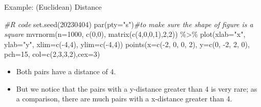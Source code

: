 \documentclass[
  ignorenonframetext,
]{beamer}
\newenvironment{Shaded}{\begin{snugshade}}{\end{snugshade}}
\newcommand{\AttributeTok}[1]{\textcolor[rgb]{0.77,0.63,0.00}{#1}}
\newcommand{\CommentTok}[1]{\textcolor[rgb]{0.56,0.35,0.01}{\textit{#1}}}
\newcommand{\DecValTok}[1]{\textcolor[rgb]{0.00,0.00,0.81}{#1}}
\newcommand{\FunctionTok}[1]{\textcolor[rgb]{0.00,0.00,0.00}{#1}}
\newcommand{\NormalTok}[1]{#1}
\newcommand{\SpecialCharTok}[1]{\textcolor[rgb]{0.00,0.00,0.00}{#1}}
\newcommand{\StringTok}[1]{\textcolor[rgb]{0.31,0.60,0.02}{#1}}
\providecommand{\tightlist}{%
  \setlength{\itemsep}{0pt}\setlength{\parskip}{0pt}}
\begin{document}
\begin{frame}[fragile]{Example: (Euclidean) Distance}
\protect\hypertarget{example-euclidean-distance-2}{}
\begin{Shaded}
\begin{Highlighting}[]
\CommentTok{\#R code}
\FunctionTok{set.seed}\NormalTok{(}\DecValTok{20230404}\NormalTok{)}
\FunctionTok{par}\NormalTok{(}\AttributeTok{pty=}\StringTok{"s"}\NormalTok{)}\CommentTok{\#to make sure the shape of figure is a square}
\FunctionTok{mvrnorm}\NormalTok{(}\AttributeTok{n=}\DecValTok{1000}\NormalTok{, }\FunctionTok{c}\NormalTok{(}\DecValTok{0}\NormalTok{,}\DecValTok{0}\NormalTok{), }\FunctionTok{matrix}\NormalTok{(}\FunctionTok{c}\NormalTok{(}\DecValTok{4}\NormalTok{,}\DecValTok{0}\NormalTok{,}\DecValTok{0}\NormalTok{,}\DecValTok{1}\NormalTok{),}\DecValTok{2}\NormalTok{,}\DecValTok{2}\NormalTok{)) }\SpecialCharTok{\%\textgreater{}\%} 
  \FunctionTok{plot}\NormalTok{(}\AttributeTok{xlab=}\StringTok{"x"}\NormalTok{, }\AttributeTok{ylab=}\StringTok{"y"}\NormalTok{, }\AttributeTok{xlim=}\FunctionTok{c}\NormalTok{(}\SpecialCharTok{{-}}\DecValTok{4}\NormalTok{,}\DecValTok{4}\NormalTok{), }\AttributeTok{ylim=}\FunctionTok{c}\NormalTok{(}\SpecialCharTok{{-}}\DecValTok{4}\NormalTok{,}\DecValTok{4}\NormalTok{))}
\FunctionTok{points}\NormalTok{(}\AttributeTok{x=}\FunctionTok{c}\NormalTok{(}\SpecialCharTok{{-}}\DecValTok{2}\NormalTok{, }\DecValTok{0}\NormalTok{, }\DecValTok{0}\NormalTok{, }\DecValTok{2}\NormalTok{), }\AttributeTok{y=}\FunctionTok{c}\NormalTok{(}\DecValTok{0}\NormalTok{, }\SpecialCharTok{{-}}\DecValTok{2}\NormalTok{, }\DecValTok{2}\NormalTok{, }\DecValTok{0}\NormalTok{), }\AttributeTok{pch=}\DecValTok{15}\NormalTok{, }
       \AttributeTok{col=}\FunctionTok{c}\NormalTok{(}\DecValTok{2}\NormalTok{,}\DecValTok{3}\NormalTok{,}\DecValTok{3}\NormalTok{,}\DecValTok{2}\NormalTok{),}\AttributeTok{cex=}\DecValTok{3}\NormalTok{)}
\end{Highlighting}
\end{Shaded}

\begin{itemize}
\tightlist
\item
  Both pairs have a distance of 4.
\item
  But we notice that the pairs with a y-distance greater than 4 is very
  rare; as a comparison, there are much pairs with a x-distance greater
  than 4.
\end{itemize}
\end{frame}
\end{document}
